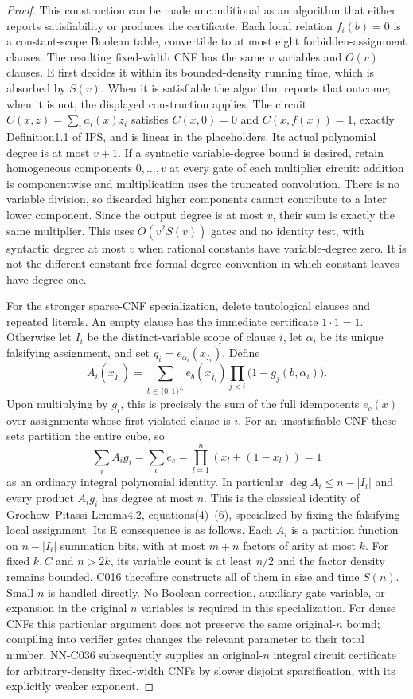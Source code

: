 \begin{proof}
This construction can be made unconditional as an algorithm that either reports satisfiability or produces the certificate. Each local relation $f_i(b)=0$ is a constant-scope Boolean table, convertible to at most eight forbidden-assignment clauses. The resulting fixed-width CNF has the same $v$ variables and $O(v)$ clauses. E first decides it within its bounded-density running time, which is absorbed by $S(v)$. When it is satisfiable the algorithm reports that outcome; when it is not, the displayed construction applies. The circuit $C(x,z)=\sum_i a_i(x)z_i$ satisfies $C(x,0)=0$ and $C(x,f(x))=1$, exactly Definition1.1 of IPS, and is linear in the placeholders. Its actual polynomial degree is at most $v+1$. If a syntactic variable-degree bound is desired, retain homogeneous components $0,\ldots,v$ at every gate of each multiplier circuit: addition is componentwise and multiplication uses the truncated convolution. There is no variable division, so discarded higher components cannot contribute to a later lower component. Since the output degree is at most $v$, their sum is exactly the same multiplier. This uses $O(v^2 S(v))$ gates and no identity test, with syntactic degree at most $v$ when rational constants have variable-degree zero. It is not the different constant-free formal-degree convention in which constant leaves have degree one.

For the stronger sparse-CNF specialization, delete tautological clauses and repeated literals. An empty clause has the immediate certificate $1\cdot1=1$. Otherwise let $I_i$ be the distinct-variable scope of clause $i$, let $\alpha_i$ be its unique falsifying assignment, and set $g_i=e_{\alpha_i}(x_{I_i})$. Define
\[
 A_i(x_{\overline I_i})=
    \sum_{b\in\{0,1\}^{\overline I_i}}
       e_b(x_{\overline I_i})
       \prod_{j<i}\bigl(1-g_j(b,\alpha_i)\bigr).
\]
Upon multiplying by $g_i$, this is precisely the sum of the full idempotents $e_c(x)$ over assignments whose first violated clause is $i$. For an unsatisfiable CNF these sets partition the entire cube, so
\[
              \sum_i A_i g_i=\sum_c e_c
                   =\prod_{l=1}^n(x_l+(1-x_l))=1
\]
as an ordinary integral polynomial identity. In particular $\deg A_i\leq n-|I_i|$ and every product $A_i g_i$ has degree at most $n$. This is the classical identity of Grochow--Pitassi Lemma4.2, equations(4)--(6), specialized by fixing the falsifying local assignment. Its E consequence is as follows. Each $A_i$ is a partition function on $n-|I_i|$ summation bits, with at most $m+n$ factors of arity at most $k$. For fixed $k,C$ and $n>2k$, its variable count is at least $n/2$ and the factor density remains bounded. C016 therefore constructs all of them in size and time $S(n)$. Small $n$ is handled directly. No Boolean correction, auxiliary gate variable, or expansion in the original $n$ variables is required in this specialization. For dense CNFs this particular argument does not preserve the same original-$n$ bound; compiling into verifier gates changes the relevant parameter to their total number. NN-C036 subsequently supplies an original-$n$ integral circuit certificate for arbitrary-density fixed-width CNFs by slower disjoint sparsification, with its explicitly weaker exponent.


\end{proof}
